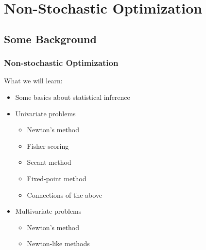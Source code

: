 \section{Non-Stochastic Optimization}


\subsection{Some Background}

\begin{frame}
  \frametitle{Non-stochastic Optimization}
  What we will learn:
  \begin{itemize}
    \item Some basics about statistical inference
    \item Univariate problems
        \begin{itemize}
            \item Newton's method
            \item Fisher scoring
            \item Secant method
            \item Fixed-point method
            \item Connections of the above
        \end{itemize}
    \item Multivariate problems
        \begin{itemize}
            \item Newton's method
            \item Newton-like methods
        \end{itemize}
  \end{itemize}

  \end{frame}


